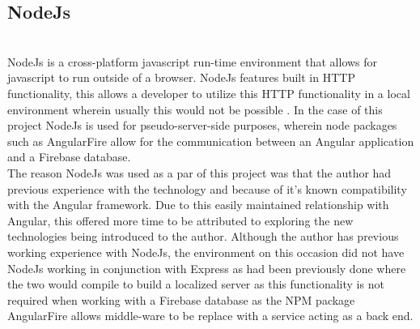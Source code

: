 \subsection{NodeJs} \\
NodeJs is a cross-platform javascript run-time environment that allows for javascript to run outside of a browser. NodeJs features built in HTTP functionality, this allows a developer to utilize this HTTP functionality in a local environment wherein usually this would not be possible \cite{nodejs}. In the case of this project NodeJs is used for pseudo-server-side purposes, wherein node packages such as AngularFire allow for the communication between an Angular application and a Firebase database. \\ 
The reason NodeJs was used as a par of this project was that the author had previous experience with the technology and because of it's known compatibility with the Angular framework. Due to this easily maintained relationship with Angular, this offered more time to be attributed to exploring the new technologies being introduced to the author. Although the author has previous working experience with NodeJs, the environment on this occasion did not have NodeJs working in conjunction with Express as had been previously done where the two would compile to build a localized server as this functionality is not required when working with a Firebase database as the NPM package AngularFire allows middle-ware to be replace with a service acting as a back end\cite{angfire}. \\
\n
